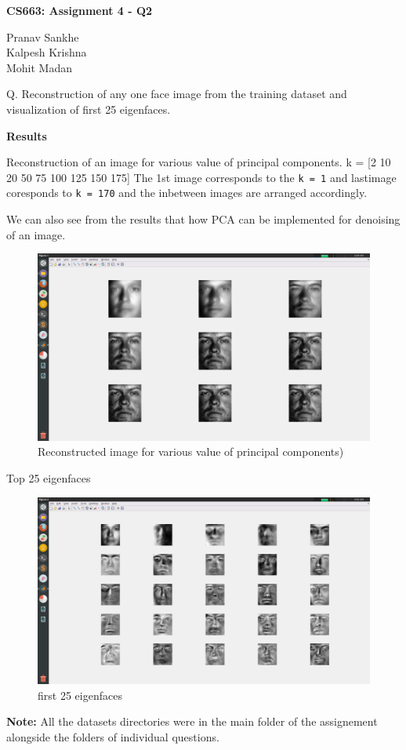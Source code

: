 \documentclass{article}
\begin{document}
{\textbf{CS663: Assignment 4 - Q2}}
\vskip 0.2in

Pranav Sankhe \\ Kalpesh Krishna \\ Mohit Madan 

\vskip 0.5in
Q. Reconstruction of any one face image from the training dataset and visualization of first 25 eigenfaces. 

\vskip 0.2in

\textbf{Results}

\vskip 0.5in
Reconstruction of an image for various value of principal components. 
k = [2 10 20 50 75 100 125 150 175] 
The 1st image corresponds to the \texttt{k = 1} and lastimage coresponds to \texttt{k = 170} and the inbetween images are arranged accordingly. 

We can also see from the results that how PCA can be implemented for denoising of an image.

\begin{figure}[h!]
  \includegraphics[width=\linewidth]{recon.png}
  \caption{Reconstructed image for various value of principal components)}
  \label{fig:result1}
\end{figure}
\newpage
Top 25 eigenfaces
\begin{figure}[h!]
  \includegraphics[width=\linewidth]{first_25.png}
  \caption{first 25 eigenfaces}
  \label{fig:result2}
\end{figure}

\textbf{Note:} All the datasets directories were in the main folder of the assignement alongside the folders of individual questions. 
\end{document}
